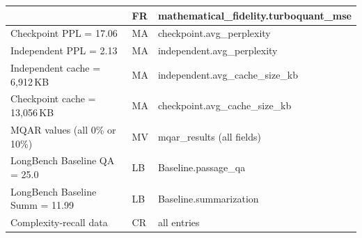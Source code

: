 \begin{table}[H]
\begin{tabular}{@{}p{4.2cm}lp{4.5cm}@{}}
  & FR & mathematical\_fidelity.turboquant\_mse \\
\midrule
Checkpoint PPL = 17.06
  & MA & checkpoint.avg\_perplexity \\
Independent PPL = 2.13
  & MA & independent.avg\_perplexity \\
Independent cache = 6{,}912\,KB
  & MA & independent.avg\_cache\_size\_kb \\
Checkpoint cache = 13{,}056\,KB
  & MA & checkpoint.avg\_cache\_size\_kb \\
\midrule
MQAR values (all 0\% or 10\%)
  & MV & mqar\_results (all fields) \\
LongBench Baseline QA = 25.0
  & LB & Baseline.passage\_qa \\
LongBench Baseline Summ = 11.99
  & LB & Baseline.summarization \\
Complexity-recall data
  & CR & all entries \\
\bottomrule
\end{tabular}
\end{table}
